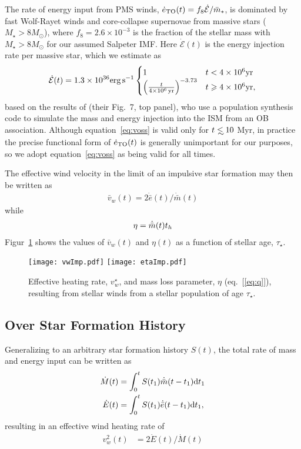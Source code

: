 The rate of energy input from PMS winds, $\dot{e}_{\rm TO}(t) = f_{8}\dot{\mathcal{E}}/\bar{m}_*$, is dominated by fast Wolf-Rayet winds and core-collapse supernovae from massive stars ($M_{\star} > 8M_{\odot}$), where $f_{8} =2.6 \times 10^{-3}$ is the fraction of the stellar mass with $M_{\star} > 8M_{\odot}$ for our assumed Salpeter IMF.  Here $\dot{\mathcal{E}} (t)$ is the energy injection rate per massive star, which we estimate as
\begin{align}
\dot{\mathcal{E}} (t)=  1.3 \times 10^{36} {\rm erg\,s^{-1}}
\begin{cases}
  1 & t<4 \times 10^6 {\rm yr}\\
  \left(\frac{t}{4 \times  10^6\,{\rm yr}}\right)^{-3.73} & t \ge 4 \times 10^6 {\rm yr},
\end{cases}
\label{eq:voss}
\end{align}
based on the results of \citet{VossDiehl+:2009a} (their Fig.~7, top panel), who use a population synthesis code to simulate the mass and energy injection into the ISM from an OB association.  Although equation~\eqref{eq:voss} is valid only for $t \lsim 10$ Myr, in practice the precise functional form of $\dot{e}_{\rm TO}(t)$ is generally unimportant for our purposes, so we adopt equation~\eqref{eq:voss} as being valid for all times.


The effective wind velocity in the limit of an impulsive star formation may then be written
as 
\begin{align}
\bar{v}_w(t)=2 \dot{\bar{e}}(t)/\dot{\bar{m}}(t)
\label{eq:vwImp}
\end{align}
while 
\begin{align}
\eta = \dot{\bar{m}}(t) \th
\label{eq:vwImp}
\end{align}
 Figur~\ref{fig:vwImp} shows the values of $\bar{v}_w(t)$ and $\eta(t)$ as a function of stellar age, $\tau_{\star}$.

\begin{figure}
\texttt{[image: vwImp.pdf]}
\texttt{[image: etaImp.pdf]}
\caption{\label{fig:vwImp} Effective heating rate, $v_w^{\star}$, and mass loss parameter, $\eta$ (eq.~[\ref{eq:q}]), resulting from stellar winds from a stellar population of age $\tau_{\star}$.}
\end{figure}



\subsection{Over Star Formation History}
Generalizing to an arbitrary star formation history $S(t)$, the total rate of mass and energy input can be written as
\begin{align} 
  \dot{M}(t) &= \int_0^t S(t_1) \dot{\bar{m}}(t-t_1){\rm
      d}t_1\\
  \dot{E}(t) &= \int_0^t S(t_1) \dot{\bar{e}}(t-t_1){\rm
      d}t_1,\\
\end{align}
resulting in an effective wind heating rate of
\begin{align}
  v_w^2(t) &=2 \dot{E}(t)/\dot{M}(t)
\end{align}


